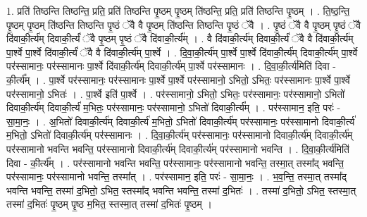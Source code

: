 \documentclass[17pt]{extarticle}
\begin{document}
1. प्रति॑ तिष्ठन्ति तिष्ठन्ति॒ प्रति॒ प्रति॑ तिष्ठन्ति पृ॒ष्ठम् पृ॒ष्ठम् ति॑ष्ठन्ति॒ प्रति॒ प्रति॑ तिष्ठन्ति पृ॒ष्ठम् । . ति॒ष्ठ॒न्ति॒ पृ॒ष्ठम् पृ॒ष्ठम् ति॑ष्ठन्ति तिष्ठन्ति पृ॒ष्ठं ॅवै वै पृ॒ष्ठम् ति॑ष्ठन्ति तिष्ठन्ति पृ॒ष्ठं ॅवै । . पृ॒ष्ठं ॅवै वै पृ॒ष्ठम् पृ॒ष्ठं ॅवै दि॑वाकी॒र्त्य॑म् दिवाकी॒र्त्यं॑ ॅवै पृ॒ष्ठम् पृ॒ष्ठं ॅवै दि॑वाकी॒र्त्य᳚म् । . वै दि॑वाकी॒र्त्य॑म् दिवाकी॒र्त्यं॑ ॅवै वै दि॑वाकी॒र्त्य॑म् पा॒र्श्वे पा॒र्श्वे दि॑वाकी॒र्त्यं॑ ॅवै वै दि॑वाकी॒र्त्य॑म् पा॒र्श्वे । . दि॒वा॒की॒र्त्य॑म् पा॒र्श्वे पा॒र्श्वे दि॑वाकी॒र्त्य॑म् दिवाकी॒र्त्य॑म् पा॒र्श्वे पर॑स्सामानः॒ पर॑स्सामानः पा॒र्श्वे दि॑वाकी॒र्त्य॑म् दिवाकी॒र्त्य॑म् पा॒र्श्वे पर॑स्सामानः । . दि॒वा॒की॒र्त्य॑मिति॑ दिवा - की॒र्त्य᳚म् । . पा॒र्श्वे पर॑स्सामानः॒ पर॑स्सामानः पा॒र्श्वे पा॒र्श्वे पर॑स्सामानो॒ ऽभितो॒ ऽभितः॒ पर॑स्सामानः पा॒र्श्वे पा॒र्श्वे पर॑स्सामानो॒ ऽभितः॑ । . पा॒र्श्वे इति॑ पा॒र्श्वे । . पर॑स्सामानो॒ ऽभितो॒ ऽभितः॒ पर॑स्सामानः॒ पर॑स्सामानो॒ ऽभितो॑ दिवाकी॒र्त्य॑म् दिवाकी॒र्त्य॑ म॒भितः॒ पर॑स्सामानः॒ पर॑स्सामानो॒ ऽभितो॑ दिवाकी॒र्त्य᳚म् । . पर॑स्सामान॒ इति॒ परः॑ - सा॒मा॒नः॒ । . अ॒भितो॑ दिवाकी॒र्त्य॑म् दिवाकी॒र्त्य॑ म॒भितो॒ ऽभितो॑ दिवाकी॒र्त्य॑म् पर॑स्सामानः॒ पर॑स्सामानो दिवाकी॒र्त्य॑ म॒भितो॒ ऽभितो॑ दिवाकी॒र्त्य॑म् पर॑स्सामानः । . दि॒वा॒की॒र्त्य॑म् पर॑स्सामानः॒ पर॑स्सामानो दिवाकी॒र्त्य॑म् दिवाकी॒र्त्य॑म् पर॑स्सामानो भवन्ति भवन्ति॒ पर॑स्सामानो दिवाकी॒र्त्य॑म् दिवाकी॒र्त्य॑म् पर॑स्सामानो भवन्ति । . दि॒वा॒की॒र्त्य॑मिति॑ दिवा - की॒र्त्य᳚म् । . पर॑स्सामानो भवन्ति भवन्ति॒ पर॑स्सामानः॒ पर॑स्सामानो भवन्ति॒ तस्मा॒त् तस्मा᳚द् भवन्ति॒ पर॑स्सामानः॒ पर॑स्सामानो भवन्ति॒ तस्मा᳚त् । . पर॑स्सामान॒ इति॒ परः॑ - सा॒मा॒नः॒ । . भ॒व॒न्ति॒ तस्मा॒त् तस्मा᳚द् भवन्ति भवन्ति॒ तस्मा॑ द॒भितो॒ ऽभित॒ स्तस्मा᳚द् भवन्ति भवन्ति॒ तस्मा॑ द॒भितः॑ । . तस्मा॑ द॒भितो॒ ऽभित॒ स्तस्मा॒त् तस्मा॑ द॒भितः॑ पृ॒ष्ठम् पृ॒ष्ठ म॒भित॒ स्तस्मा॒त् तस्मा॑ द॒भितः॑ पृ॒ष्ठम् । \newline
\end{document}
